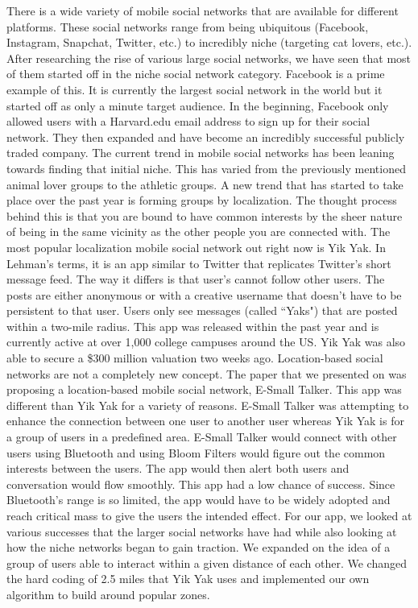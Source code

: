There is a wide variety of mobile social networks that are available for different platforms. These social networks range from being ubiquitous (Facebook, Instagram, Snapchat, Twitter, etc.) to incredibly niche (targeting cat lovers, etc.). After researching the rise of various large social networks, we have seen that most of them started off in the niche social network category. Facebook is a prime example of this. It is currently the largest social network in the world but it started off as only a minute target audience. In the beginning, Facebook only allowed users with a Harvard.edu email address to sign up for their social network. They then expanded and have become an incredibly successful publicly traded company.
The current trend in mobile social networks has been leaning towards finding that initial niche. This has varied from the previously mentioned animal lover groups to the athletic groups. A new trend that has started to take place over the past year is forming groups by localization. The thought process behind this is that you are bound to have common interests by the sheer nature of being in the same vicinity as the other people you are connected with. The most popular localization mobile social network out right now is Yik Yak. In Lehman's terms, it is an app similar to Twitter that replicates Twitter's short message feed. The way it differs is that user's cannot follow other users. The posts are either anonymous or with a creative username that doesn't have to be persistent to that user. Users only see messages (called ``Yaks") that are posted within a two-mile radius. This app was released within the past year and is currently active at over 1,000 college campuses around the US. Yik Yak was also able to secure a \$300 million valuation two weeks ago. 
Location-based social networks are not a completely new concept. The paper that we presented on was proposing a location-based mobile social network, E-Small Talker. This app was different than Yik Yak for a variety of reasons. E-Small Talker was attempting to enhance the connection between one user to another user whereas Yik Yak is for a group of users in a predefined area. E-Small Talker would connect with other users using Bluetooth and using Bloom Filters would figure out the common interests between the users. The app would then alert both users and conversation would flow smoothly. This app had a low chance of success. Since Bluetooth's range is so limited, the app would have to be widely adopted and reach critical mass to give the users the intended effect.
For our app, we looked at various successes that the larger social networks have had while also looking at how the niche networks began to gain traction. We expanded on the idea of a group of users able to interact within a given distance of each other. We changed the hard coding of 2.5 miles that Yik Yak uses and implemented our own algorithm to build around popular zones. 